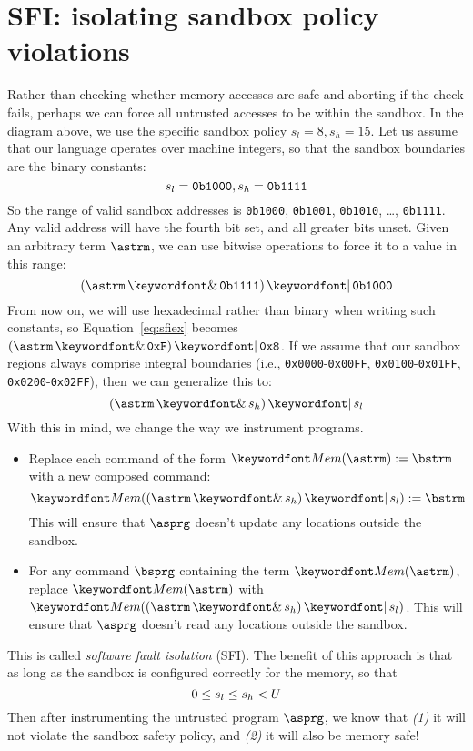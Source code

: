 \documentclass[11pt,twoside]{scrartcl}
\begin{document}
\section{SFI: isolating sandbox policy violations}
Rather than checking whether memory accesses are safe and aborting if the check fails, perhaps we can force all untrusted accesses to be within the sandbox. In the diagram above, we use the specific sandbox policy $s_l=8, s_h=15$. Let us assume that our language operates over machine integers, so that the sandbox boundaries are the binary constants:
\[
s_l = \verb'0b1000', s_h = \verb'0b1111'
\]
So the range of valid sandbox addresses is \verb'0b1000', \verb'0b1001', \verb'0b1010', \ldots, \verb'0b1111'. Any valid address will have the fourth bit set, and all greater bits unset. Given an arbitrary term $\astrm$, we can use bitwise operations to force it to a value in this range:
\begin{equation}
\label{eq:sfiex}
(\astrm \bitand \verb'0b1111') \bitor \verb'0b1000'
\end{equation}
From now on, we will use hexadecimal rather than binary when writing such constants, so Equation~\ref{eq:sfiex} becomes $(\astrm \bitand \verb'0xF') \bitor \verb'0x8'$. If we assume that our sandbox regions always comprise integral boundaries (i.e., \verb'0x0000'-\verb'0x00FF', \verb'0x0100'-\verb'0x01FF', \verb'0x0200'-\verb'0x02FF'), then we can generalize this to:
\begin{equation}
\label{eq:sfiex}
(\astrm \bitand s_h) \bitor s_l
\end{equation}
With this in mind, we change the way we instrument programs.
\begin{itemize}
  \item Replace each command of the form $\pderef{\astrm}:=\bstrm$ with a new composed command:
  \[
  \pderef{(\astrm \bitand s_h) \bitor s_l}:=\bstrm
  \]
  This will ensure that $\asprg$ doesn't update any locations outside the sandbox.

  \item For any command $\bsprg$ containing the term $\pderef{\astrm}$, replace $\pderef{\astrm}$ with $\pderef{(\astrm \bitand s_h) \bitor s_l}$.
  This will ensure that $\asprg$ doesn't read any locations outside the sandbox.
\end{itemize}
This is called \emph{software fault isolation} (SFI).
The benefit of this approach is that as long as the sandbox is configured correctly for the memory, so that
\begin{equation}
0 \le s_l \le s_h < U
\end{equation}
Then after instrumenting the untrusted program $\asprg$, we know that \emph{(1)} it will not violate the sandbox safety policy, and \emph{(2)} it will also be memory safe! 
\end{document}
